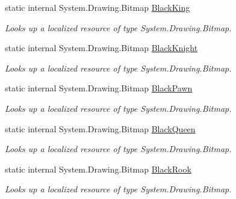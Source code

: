 \begin{DoxyCompactItemize}
static internal System.\+Drawing.\+Bitmap \mbox{\hyperlink{class_chess_tracking_1_1_properties_1_1_resources_a52ea8aebc2d43137b4c83661a7105377}{Black\+King}}
\begin{DoxyCompactList}\small\item\em Looks up a localized resource of type System.\+Drawing.\+Bitmap. \end{DoxyCompactList}\item 
static internal System.\+Drawing.\+Bitmap \mbox{\hyperlink{class_chess_tracking_1_1_properties_1_1_resources_ac4d81b84a4f3482264fe3e16f12aa03e}{Black\+Knight}}
\begin{DoxyCompactList}\small\item\em Looks up a localized resource of type System.\+Drawing.\+Bitmap. \end{DoxyCompactList}\item 
static internal System.\+Drawing.\+Bitmap \mbox{\hyperlink{class_chess_tracking_1_1_properties_1_1_resources_afb952d8090da2aba48f1e16465881fb4}{Black\+Pawn}}
\begin{DoxyCompactList}\small\item\em Looks up a localized resource of type System.\+Drawing.\+Bitmap. \end{DoxyCompactList}\item 
static internal System.\+Drawing.\+Bitmap \mbox{\hyperlink{class_chess_tracking_1_1_properties_1_1_resources_af9792042592f9165ebd74e039945b336}{Black\+Queen}}
\begin{DoxyCompactList}\small\item\em Looks up a localized resource of type System.\+Drawing.\+Bitmap. \end{DoxyCompactList}\item 
static internal System.\+Drawing.\+Bitmap \mbox{\hyperlink{class_chess_tracking_1_1_properties_1_1_resources_acd6690fa361ba12b845b2e6927a0ceca}{Black\+Rook}}
\begin{DoxyCompactList}\small\item\em Looks up a localized resource of type System.\+Drawing.\+Bitmap. \end{DoxyCompactList}\item 

\end{DoxyCompactItemize}
